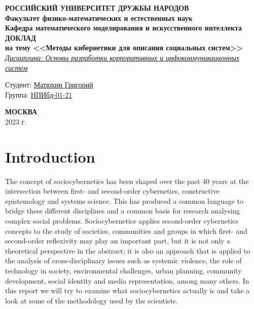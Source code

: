 \documentclass[a4page]{article}
\begin{document}
\begin{titlepage}

	\begin{center}
		\hfill \break
		\textbf{
			\large{РОССИЙСКИЙ УНИВЕРСИТЕТ ДРУЖБЫ НАРОДОВ}\\
			\normalsize{Факультет физико-математических и естественных наук}\\
			\normalsize{Кафедра математического моделирования и искусственного интеллекта}\\
		}
		\vspace*{\fill}
		\Large{\textbf{ДОКЛАД\\ на тему <<Методы кибернетики для описания социальных систем>>}}
		\\
		\underline{\textit{\normalsize{Дисциплина: Основы разработки корпоративных и инфокоммуникационных систем}}}
		\vspace*{\fill}

	\end{center}

	\begin{flushright}
		Студент: \underline{Матюхин Григорий}\\ \vspace{0.5cm}
		Группа: \underline{НПИбд-01-21}
	\end{flushright}


	\begin{center} \textbf{МОСКВА} \\ 2023 г. \end{center}
	\thispagestyle{empty} %

\end{titlepage}

\newpage

\tableofcontents

\newpage

\section{Introduction}
The concept of sociocybernetics has been shaped over the past 40 years at the intersection between first- and second-order cybernetics, constructive epistemology and systems science. This has produced a common language to bridge these different disciplines and a common basis for research analysing complex social problems. Sociocybernetics applies second-order cybernetics concepts to the study of societies, communities and groups in which first- and second-order reflexivity may play an important part, but it is not only a theoretical perspective in the abstract; it is also an approach that is applied to the analysis of cross-disciplinary issues such as systemic violence, the role of technology in society, environmental challenges, urban planning, community development, social identity and media representation, among many others. In this report we will try to examine what sociocybernetics actually is and take a look at some of the methodology used by the scientists.
\end{document}
